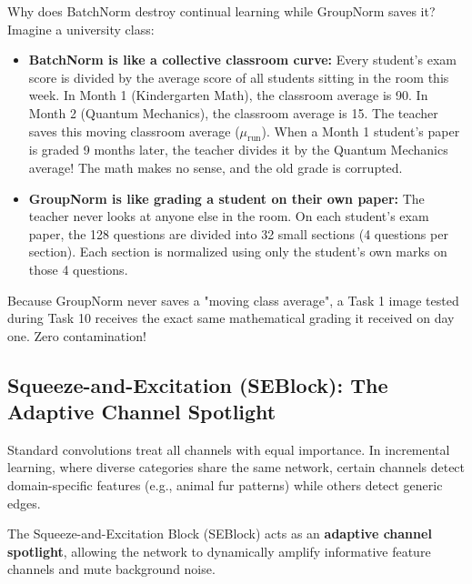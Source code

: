 \documentclass[11pt,a4paper]{article}
\begin{document}
\begin{callout}
Why does BatchNorm destroy continual learning while GroupNorm saves it?\newline
Imagine a university class:
\begin{itemize}[noitemsep]
    \item \textbf{BatchNorm is like a collective classroom curve:} Every student's exam score is divided by the average score of all students sitting in the room this week. In Month 1 (Kindergarten Math), the classroom average is 90. In Month 2 (Quantum Mechanics), the classroom average is 15. The teacher saves this moving classroom average ($\mu_{\text{run}}$). When a Month 1 student's paper is graded 9 months later, the teacher divides it by the Quantum Mechanics average! The math makes no sense, and the old grade is corrupted.
    \item \textbf{GroupNorm is like grading a student on their own paper:} The teacher never looks at anyone else in the room. On each student's exam paper, the 128 questions are divided into 32 small sections (4 questions per section). Each section is normalized using only the student's own marks on those 4 questions.
\end{itemize}
Because GroupNorm never saves a "moving class average", a Task 1 image tested during Task 10 receives the exact same mathematical grading it received on day one. Zero contamination!
\end{callout}

\subsection{Squeeze-and-Excitation (SEBlock): The Adaptive Channel Spotlight}
Standard convolutions treat all channels with equal importance. In incremental learning, where diverse categories share the same network, certain channels detect domain-specific features (e.g., animal fur patterns) while others detect generic edges. 

The Squeeze-and-Excitation Block (SEBlock) acts as an \textbf{adaptive channel spotlight}, allowing the network to dynamically amplify informative feature channels and mute background noise.
\end{document}
